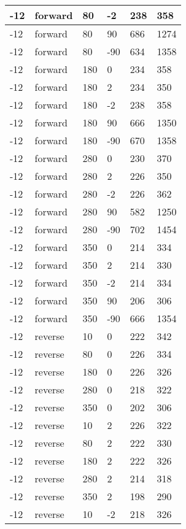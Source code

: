 \begin{table}
\begin{center}
\begin{tabular}{|l|l|l|l|l|l|}
			-12 & forward & 80 & -2 & 238 & 358 \\
			\hline
			-12 & forward & 80 & 90 & 686 & 1274 \\
			\hline
			-12 & forward & 80 & -90 & 634 & 1358 \\
			\hline
			-12 & forward & 180 & 0 & 234 & 358 \\
			\hline
			-12 & forward & 180 & 2 & 234 & 350 \\
			\hline
			-12 & forward & 180 & -2 & 238 & 358 \\
			\hline
			-12 & forward & 180 & 90 & 666 & 1350 \\
			\hline
			-12 & forward & 180 & -90 & 670 & 1358 \\
			\hline
			-12 & forward & 280 & 0 & 230 & 370 \\
			\hline
			-12 & forward & 280 & 2 & 226 & 350 \\
			\hline
			-12 & forward & 280 & -2 & 226 & 362 \\
			\hline
			-12 & forward & 280 & 90 & 582 & 1250 \\
			\hline
			-12 & forward & 280 & -90 & 702 & 1454 \\
			\hline
			-12 & forward & 350 & 0 & 214 & 334 \\
			\hline
			-12 & forward & 350 & 2 & 214 & 330 \\
			\hline
			-12 & forward & 350 & -2 & 214 & 334 \\
			\hline
			-12 & forward & 350 & 90 & 206 & 306 \\
			\hline
			-12 & forward & 350 & -90 & 666 & 1354 \\
			\hline
			-12 & reverse & 10 & 0 & 222 & 342 \\
			\hline
			-12 & reverse & 80 & 0 & 226 & 334 \\
			\hline
			-12 & reverse & 180 & 0 & 226 & 326 \\
			\hline
			-12 & reverse & 280 & 0 & 218 & 322 \\
			\hline
			-12 & reverse & 350 & 0 & 202 & 306 \\
			\hline
			-12 & reverse & 10 & 2 & 226 & 322 \\
			\hline
			-12 & reverse & 80 & 2 & 222 & 330 \\
			\hline
			-12 & reverse & 180 & 2 & 222 & 326 \\
			\hline
			-12 & reverse & 280 & 2 & 214 & 318 \\
			\hline
			-12 & reverse & 350 & 2 & 198 & 290 \\
			\hline
			-12 & reverse & 10 & -2 & 218 & 326 \\

\end{tabular}
\end{center}
\end{table}
